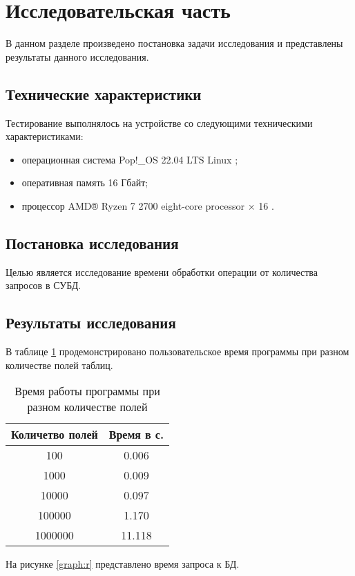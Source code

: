 \section{Исследовательская часть}

В данном разделе произведено постановка задачи исследования и представлены
результаты данного исследования.

\subsection{Технические характеристики}
Тестирование выполнялось на устройстве со следующими техническими
характеристиками:
\begin{itemize}
	\item операционная система Pop!\_OS 22.04 LTS \cite{popos} Linux
	      \cite{Linux};
	\item оперативная память 16 Гбайт;
	\item процессор AMD® Ryzen 7 2700 eight-core processor × 16 \cite{amd}.
\end{itemize}

\subsection{Постановка исследования}

Целью является исследование времени обработки операции от количества запросов в
СУБД.

\subsection{Результаты исследования}

В таблице \ref{tab:time1} продемонстрировано пользовательское время программы
при разном количестве полей таблиц.

\begin{table}[ht!]
	\begin{center}

		\caption{Время работы программы при разном
			количестве
			полей}
		\label{tab:time1}
		\begin{tabular}{|c|c|}
			\hline
			Количетво полей & Время в с. \\
			\hline
			100             & 0.006      \\
			\hline
			1000            & 0.009      \\
			\hline
			10000           & 0.097      \\
			\hline
			100000          & 1.170      \\
			\hline
			1000000         & 11.118     \\
			\hline

		\end{tabular}
	\end{center}
\end{table}
\newpage
На рисунке \ref{graph:r} представлено время запроса к БД.

